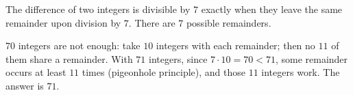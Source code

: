 The difference of two integers is divisible by $7$ exactly when they leave the same remainder upon division by $7$. There are $7$ possible remainders.

$70$ integers are not enough: take $10$ integers with each remainder; then no $11$ of them share a remainder. With $71$ integers, since $7\cdot10=70<71$, some remainder occurs at least $11$ times (pigeonhole principle), and those $11$ integers work. The answer is $\boxed{71}$.
